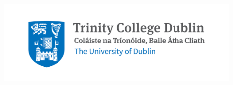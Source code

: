 \begin{titlepage}

    \center %
    
    
    
    \includegraphics[width = 0.9\textwidth]{0_title/Trinity_Main_Logo.jpg}\\[2.0cm] 
    
    
    \makeatletter
    
    { \huge \bfseries \color{tcd_blue} \@title}\\[1.0cm] %
     
    
    
    \ifdefined\cid
    \@author \\ %
    \cid \\[2cm] %
    \else
    \@author \\[2cm] %
    \fi
    
    

\end{titlepage}
